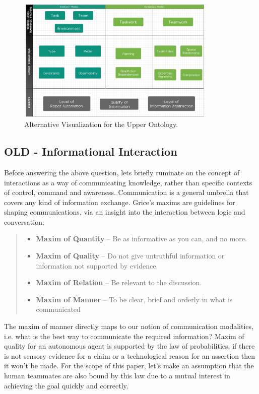 \documentclass[letterpaper, 10 pt, conference]{ieeeconf}  %
\theoremstyle{definition}
\begin{document}
\begin{figure}[h!]
    \centering
    \includegraphics[width=0.85\textwidth]{alt-ontology.png}
    \caption{Alternative Visualization for the Upper Ontology.}
    \label{fig:alt-upper-ontology}
\end{figure}

\subsection{OLD - Informational Interaction}

Before answering the above question, lets briefly ruminate on the concept of interactions as a way of communicating knowledge, rather than specific contexts of control, command and awareness.
Communication is a general umbrella that covers any kind of information exchange.
Grice's maxims \cite{grice1975logic} are guidelines for shaping communications, via an insight into the interaction between logic and conversation:
\begin{quote}
    \begin{itemize}
        \item \textbf{Maxim of Quantity} -- Be as informative as you can, and no more.
        \item \textbf{Maxim of Quality} -- Do not give untruthful information or information not supported by evidence.
        \item \textbf{Maxim of Relation} -- Be relevant to the discussion.
        \item \textbf{Maxim of Manner} -- To be clear, brief and orderly in what is communicated
    \end{itemize}
\end{quote}

The maxim of manner directly maps to our notion of communication modalities, i.e. what is the best way to communicate the required information?
Maxim of quality for an autonomous agent is supported by the law of probabilities, if there is not sensory evidence for a claim or a technological reason for an assertion then it won't be made.
For the scope of this paper, let's make an assumption that the human teammates are also bound by this law due to a mutual interest in achieving the goal quickly and correctly.
\end{document}
